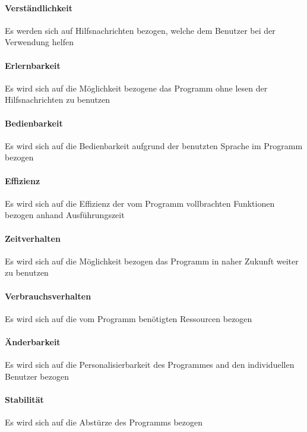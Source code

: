 \paragraph{Verständlichkeit}Es werden sich auf Hilfsnachrichten bezogen, welche dem Benutzer bei der Verwendung helfen
\paragraph{Erlernbarkeit}Es wird sich auf die Möglichkeit bezogene das Programm ohne lesen der Hilfsnachrichten zu benutzen
\paragraph{Bedienbarkeit}Es wird sich auf die Bedienbarkeit aufgrund der benutzten Sprache im Programm bezogen
\paragraph{Effizienz}Es wird sich auf die Effizienz der vom Programm vollbrachten Funktionen bezogen anhand Ausführungszeit
\paragraph{Zeitverhalten}Es wird sich auf die Möglichkeit bezogen das Programm in naher Zukunft weiter zu benutzen
\paragraph{Verbrauchsverhalten}Es wird sich auf die vom Programm benötigten Ressourcen bezogen
\paragraph{Änderbarkeit}Es wird sich auf die Personalisierbarkeit des Programmes and den individuellen Benutzer bezogen
\paragraph{Stabilität}Es wird sich auf die Abstürze des Programms bezogen
